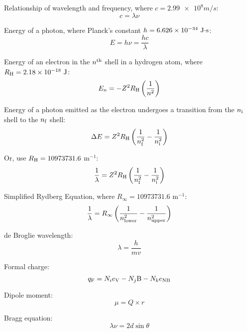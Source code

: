 \documentclass[10pt]{article}
\begin{document}
Relationship of wavelength and frequency, where $c=\num{2.99e8}\unit{m/s}$:
\begin{equation*}
c = \lambda\nu
\end{equation*}

Energy of a photon, where Planck's constant $h=\num{6.626e-34}\textnormal{ J$\cdot$s}$:
\begin{equation*}
E = h\nu = \frac{hc}{\lambda}
\end{equation*}

Energy of an electron in the $n^{\textnormal{th}}$ shell in a hydrogen atom, where $R_\textnormal{H}=\num{2.18e-18}\textnormal{ J}$:
\begin{equation*}
E_n=-Z^2R_\textnormal{H}\left(\frac{1}{n^2}\right)
\end{equation*}

Energy of a photon emitted as the electron undergoes a transition from the $n_\textnormal{i}$ shell to the $n_\textnormal{f}$ shell:
\begin{equation*}
\Delta E = Z^2R_\textnormal{H}\left(\frac{1}{n_\textnormal{f}^2}-\frac{1}{n_\textnormal{i}^2}\right)
\end{equation*}

Or, use $R_\textnormal{H} = 10973731.6$ m$^{-1}$:
\begin{equation*}
\frac{1}{\lambda} = Z^2R_\textnormal{H}\left(\frac{1}{n_\textnormal{f}^2}-\frac{1}{n_\textnormal{i}^2}\right)
\end{equation*}

Simplified Rydberg Equation, where $R_\infty = 10973731.6$ m$^{-1}$:
\begin{equation*}
\frac{1}{\lambda} = R_\infty\left(\frac{1}{n_\textnormal{lower}^2}-\frac{1}{n_\textnormal{upper}^2}\right)
\end{equation*}

de Broglie wavelength:
\begin{equation*}
\lambda=\frac{h}{mv}
\end{equation*}

Formal charge:
\begin{equation*}
q_\textnormal{F} = N_ie_\textnormal{V} - N_j\textnormal{B} - N_ke_\textnormal{NB} 
\end{equation*}

Dipole moment:
\begin{equation*}
\mu = Q\times r
\end{equation*}

Bragg equation:
\begin{equation*}
\lambda\nu = 2d \sin \theta
\end{equation*}
\end{document}
